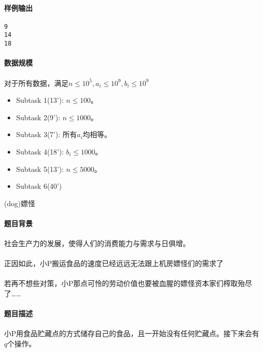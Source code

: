 \documentclass[UTF8]{ctexart}
\begin{document}
\paragraph{样例输出}
\begin{lstlisting}
9
14
18
\end{lstlisting}
\paragraph{数据规模}
\paragraph{} 对于所有数据，满足$n\leq 10^5,a_i\leq 10^9,b_i\leq 10^9$
\begin{itemize}
	\item Subtask 1(13'): $n\leq 100$。
	\item Subtask 2(9'): $n\leq 1000$。
	\item Subtask 3(7'): 所有$a_i$均相等。
	\item Subtask 4(18'): $b_i\leq 1000$。
	\item Subtask 5(13'): $n\le 5000$。
	\item Subtask 6(40')
\end{itemize}
\clearpage

\begin{center}
	\large{(dog)嫖怪}
\end{center}
\paragraph{题目背景}
\paragraph{}社会生产力的发展，使得人们的消费能力与需求与日俱增。
\paragraph{}正因如此，小P搬运食品的速度已经远远无法跟上机房嫖怪们的需求了
\paragraph{}若再不想些对策，小P那点可怜的劳动价值也要被血腥的嫖怪资本家们榨取殆尽了……
\paragraph{题目描述}
\paragraph{}小P用食品贮藏点的方式储存自己的食品，且一开始没有任何贮藏点。接下来会有$q$个操作。
\end{document}
